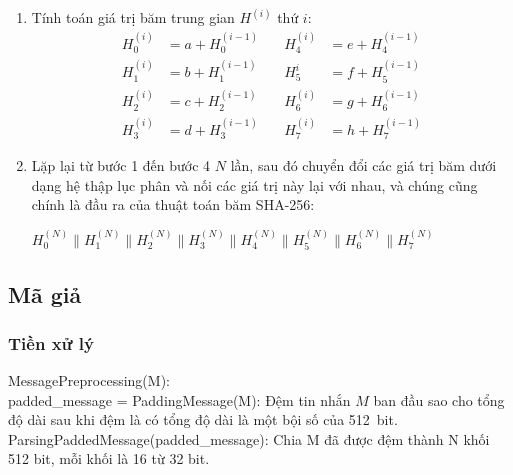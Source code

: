 \begin{enumerate}[label=\textbf{Bước \arabic*:}, leftmargin = 2.5cm]
\begin{align*}
	\end{align*}
	Trong đó:
		\begin{itemize}
			\item $T_1~ \text{và} ~T_2$: Hai biến tạm được sử dụng để tính toán theo từng chu kỳ.
			\item $a,b,c,d,e,f,g,h$: Các biến làm việc.
			\item $K_t^{\{256\}}$: Hằng số theo chu kỳ $t$.
			\item $W_t$: Từ trong lịch trình tin nhắn.
		\end{itemize}
	\item Tính toán giá trị băm trung gian $H^{(i)}$ thứ $i$:
		\begin{align*}
		H_0^{(i)} &= a + H_0^{(i-1)} \quad & H_4^{(i)} &= e + H_4^{(i-1)} \\
	H_1^{(i)} &= b + H_1^{(i-1)} \quad & H_5^{i} &= f + H_5^{(i-1)} \\
		H_2^{(i)} &= c + H_2^{(i-1)} \quad & H_6^{(i)} &= g + H_6^{(i-1)} \\
		H_3^{(i)} &= d + H_3^{(i-1)} \quad & H_7^{(i)} &= h + H_7^{(i-1)}
	\end{align*}
	\item Lặp lại từ bước 1 đến bước 4 $N$ lần, sau đó chuyển đổi các giá trị băm dưới dạng hệ thập lục phân và nối các giá trị này lại với nhau, và chúng cũng chính là đầu ra của thuật toán băm SHA-256:
		\begin{center}
			$H_0^{(N)} \parallel H_1^{(N)} \parallel H_2^{(N)} \parallel H_3^{(N)} \parallel H_4^{(N)} \parallel H_5^{(N)} \parallel H_6^{(N)} \parallel H_7^{(N)}$
		\end{center}
\end{enumerate}

\subsection{Mã giả}

\subsubsection{Tiền xử lý}

	MessagePreprocessing(M):\\
	
			padded\_message = PaddingMessage(M): Đệm tin nhắn $M$ ban đầu sao cho tổng độ dài sau khi đệm là có tổng độ dài là một bội số của 512~bit.\\
		
			ParsingPaddedMessage(padded\_message): Chia M đã được đệm thành N khối 512 bit, mỗi khối là 16 từ 32 bit.\\
			
